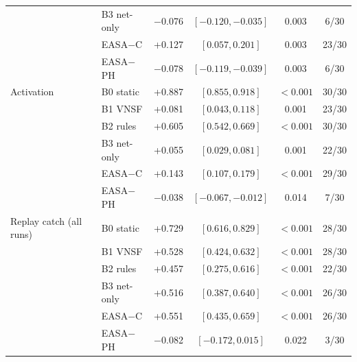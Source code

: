 \begin{table}[!t]
\begin{tabular}{llcccc}
 & B3 net-only & $-$0.076 & $[-0.120, -0.035]$ & 0.003 & 6/30 \\
 & EASA$-$C & +0.127 & $[0.057, 0.201]$ & 0.003 & 23/30 \\
 & EASA$-$PH & $-$0.078 & $[-0.119, -0.039]$ & 0.003 & 6/30 \\
\midrule
Activation & B0 static & +0.887 & $[0.855, 0.918]$ & $<0.001$ & 30/30 \\
 & B1 VNSF & +0.081 & $[0.043, 0.118]$ & 0.001 & 23/30 \\
 & B2 rules & +0.605 & $[0.542, 0.669]$ & $<0.001$ & 30/30 \\
 & B3 net-only & +0.055 & $[0.029, 0.081]$ & 0.001 & 22/30 \\
 & EASA$-$C & +0.143 & $[0.107, 0.179]$ & $<0.001$ & 29/30 \\
 & EASA$-$PH & $-$0.038 & $[-0.067, -0.012]$ & 0.014 & 7/30 \\
\midrule
Replay catch (all runs) & B0 static & +0.729 & $[0.616, 0.829]$ & $<0.001$ & 28/30 \\
 & B1 VNSF & +0.528 & $[0.424, 0.632]$ & $<0.001$ & 28/30 \\
 & B2 rules & +0.457 & $[0.275, 0.616]$ & $<0.001$ & 22/30 \\
 & B3 net-only & +0.516 & $[0.387, 0.640]$ & $<0.001$ & 26/30 \\
 & EASA$-$C & +0.551 & $[0.435, 0.659]$ & $<0.001$ & 26/30 \\
 & EASA$-$PH & $-$0.082 & $[-0.172, 0.015]$ & 0.022 & 3/30 \\
\bottomrule
\end{tabular}
\end{table}
